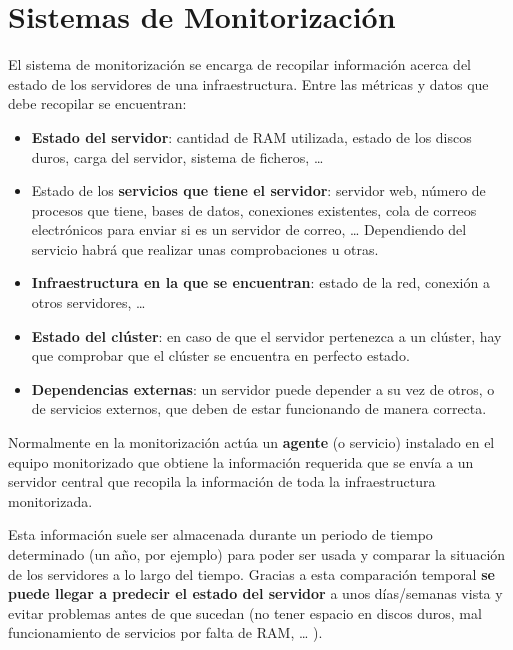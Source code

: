 \hypertarget{sistemas_de_monitorizacion}{}

\chapter{Sistemas de Monitorización}

El sistema de monitorización se encarga de recopilar información acerca del estado de los servidores de una infraestructura. Entre las métricas y datos que debe recopilar se encuentran:

\begin{itemize}
    \item \textbf{Estado del servidor}: cantidad de RAM utilizada, estado de los discos duros, carga del servidor, sistema de ficheros,  …
    \item Estado de los \textbf{servicios que tiene el servidor}: servidor web, número de procesos que tiene, bases de datos, conexiones existentes, cola de correos electrónicos para enviar si es un servidor de correo, … Dependiendo del servicio habrá que realizar unas comprobaciones u otras.
    \item \textbf{Infraestructura en la que se encuentran}: estado de la red, conexión a otros servidores, …
    \item \textbf{Estado del clúster}: en caso de que el servidor pertenezca a un clúster, hay que comprobar que el clúster se encuentra en perfecto estado.
    \item \textbf{Dependencias externas}: un servidor puede depender a su vez de otros, o de servicios externos, que deben de estar funcionando de manera correcta.
\end{itemize}

Normalmente en la monitorización actúa un \textbf{agente} (o servicio) instalado en el equipo monitorizado que obtiene la información requerida que se envía a un servidor central que recopila la información de toda la infraestructura monitorizada.

Esta información suele ser almacenada durante un periodo de tiempo determinado (un año, por ejemplo) para poder ser usada y comparar la situación de los servidores a lo largo del tiempo. Gracias a esta comparación temporal \textbf{se puede llegar a predecir el estado del servidor} a unos días/semanas vista y evitar problemas antes de que sucedan (no tener espacio en discos duros, mal funcionamiento de servicios por falta de RAM, … ).


